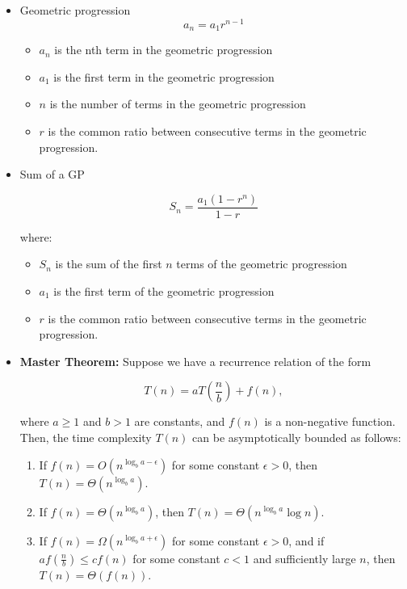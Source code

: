\documentclass{article}
\begin{document}
\begin{enumerate}
\begin{itemize}
    \item Geometric progression
    \begin{equation*}
        a_n = a_1 r^{n-1}
    \end{equation*}

    \begin{itemize}
        \item $a_n$ is the nth term in the geometric progression
        \item $a_1$ is the first term in the geometric progression
        \item $n$ is the number of terms in the geometric progression
        \item $r$ is the common ratio between consecutive terms in the geometric progression.    
    \end{itemize}
    
    \item Sum of a GP
    
    \begin{equation*}
        S_n = \frac{a_1(1-r^n)}{1-r}    
    \end{equation*}
        
        where:
        
    \begin{itemize}
        \item $S_n$ is the sum of the first $n$ terms of the geometric progression
        \item $a_1$ is the first term of the geometric progression
        \item $r$ is the common ratio between consecutive terms in the geometric progression.
    \end{itemize}

    \item \textbf{Master Theorem:} Suppose we have a recurrence relation of the form

    \begin{equation*}
    T(n) = a T(\frac{n}{b}) + f(n),
    \end{equation*}
    
    where $a \geq 1$ and $b > 1$ are constants, and $f(n)$ is a non-negative function. Then, the time complexity $T(n)$ can be asymptotically bounded as follows:
    
    \begin{enumerate}
    \item If $f(n) = O(n^{\log_b a - \epsilon})$ for some constant $\epsilon > 0$, then $T(n) = \Theta(n^{\log_b a})$.
    \item If $f(n) = \Theta(n^{\log_b a})$, then $T(n) = \Theta(n^{\log_b a} \log n)$.
    \item If $f(n) = \Omega(n^{\log_b a + \epsilon})$ for some constant $\epsilon > 0$, and if $a f(\frac{n}{b}) \leq c f(n)$ for some constant $c < 1$ and sufficiently large $n$, then $T(n) = \Theta(f(n))$.
    \end{enumerate}


\end{itemize}
\end{enumerate}
\end{document}
